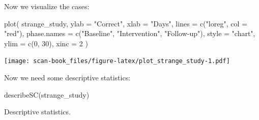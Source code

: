 \documentclass[
]{book}
\newenvironment{Shaded}{\begin{snugshade}}{\end{snugshade}}
\newcommand{\AttributeTok}[1]{\textcolor[rgb]{0.77,0.63,0.00}{#1}}
\newcommand{\DecValTok}[1]{\textcolor[rgb]{0.00,0.00,0.81}{#1}}
\newcommand{\FunctionTok}[1]{\textcolor[rgb]{0.00,0.00,0.00}{#1}}
\newcommand{\NormalTok}[1]{#1}
\newcommand{\StringTok}[1]{\textcolor[rgb]{0.31,0.60,0.02}{#1}}
\begin{document}
Now we visualize the cases:

\begin{Shaded}
\begin{Highlighting}[]
\FunctionTok{plot}\NormalTok{(}
\NormalTok{  strange\_study,}
  \AttributeTok{ylab =} \StringTok{"Correct"}\NormalTok{,}
  \AttributeTok{xlab =} \StringTok{"Days"}\NormalTok{,}
  \AttributeTok{lines =} \FunctionTok{c}\NormalTok{(}\StringTok{"loreg"}\NormalTok{, }\AttributeTok{col =} \StringTok{"red"}\NormalTok{),}
  \AttributeTok{phase.names =} \FunctionTok{c}\NormalTok{(}\StringTok{"Baseline"}\NormalTok{, }\StringTok{"Intervention"}\NormalTok{, }\StringTok{"Follow{-}up"}\NormalTok{),}
  \AttributeTok{style =} \StringTok{"chart"}\NormalTok{,}
  \AttributeTok{ylim =} \FunctionTok{c}\NormalTok{(}\DecValTok{0}\NormalTok{, }\DecValTok{30}\NormalTok{),}
  \AttributeTok{xinc =} \DecValTok{2}
\NormalTok{)}
\end{Highlighting}
\end{Shaded}

\texttt{[image: scan-book\_files/figure-latex/plot\_strange\_study-1.pdf]}

Now we need some descriptive statistics:

\begin{Shaded}
\begin{Highlighting}[]
\FunctionTok{describeSC}\NormalTok{(strange\_study)}
\end{Highlighting}
\end{Shaded}

Descriptive statistics.
\end{document}
